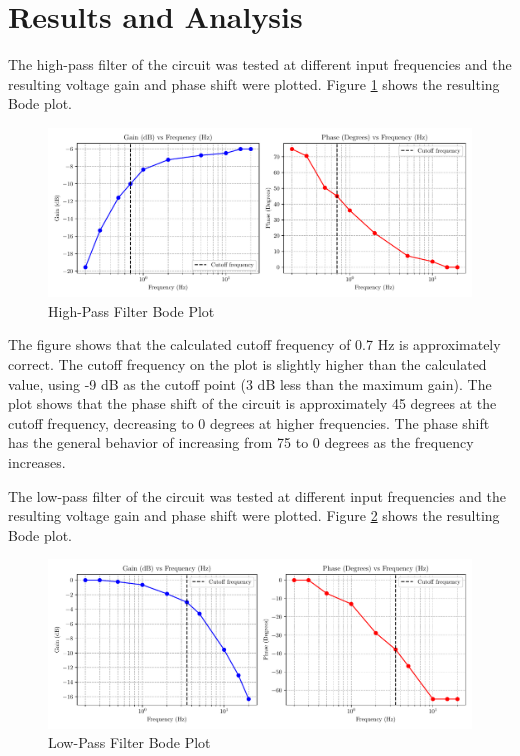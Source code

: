 \documentclass[CMPE]{KGCOEReport}
\begin{document}
\section*{Results and Analysis}

The high-pass filter of the circuit was tested at different input frequencies and the resulting voltage gain and phase shift were plotted. Figure \ref{fig:highPassBode} shows the resulting Bode plot.

\begin{figure}[H]
    \centering
    \includegraphics[width=1\textwidth]{high_pass_plot.pdf}
    \caption{High-Pass Filter Bode Plot}
    \label{fig:highPassBode}
\end{figure}

The figure shows that the calculated cutoff frequency of 0.7 Hz is approximately correct. The cutoff frequency on the plot is slightly higher than the calculated value, using -9 dB as the cutoff point (3 dB less than the maximum gain). The plot shows that the phase shift of the circuit is approximately 45 degrees at the cutoff frequency, decreasing to 0 degrees at higher frequencies. The phase shift has the general behavior of increasing from 75 to 0 degrees as the frequency increases.

The low-pass filter of the circuit was tested at different input frequencies and the resulting voltage gain and phase shift were plotted. Figure \ref{fig:lowPassBode} shows the resulting Bode plot.

\begin{figure}[H]
    \centering
    \includegraphics[width=1\textwidth]{low_pass_plot.pdf}
    \caption{Low-Pass Filter Bode Plot}
    \label{fig:lowPassBode}
\end{figure}
\end{document}
